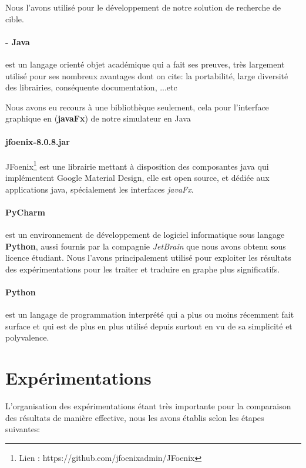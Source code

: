  Nous l'avons utilisé pour le développement de notre solution de recherche de cible.

\paragraph{- Java}  est un langage orienté objet académique qui a fait ses preuves, très largement utilisé pour ses nombreux avantages dont on cite: la portabilité,
large diversité des librairies, conséquente documentation, ...etc

Nous avons eu recours à une bibliothèque seulement, cela pour l'interface graphique en (\textbf{javaFx}) de notre simulateur en Java 
\paragraph{jfoenix-8.0.8.jar} JFoenix\footnote{Lien : https://github.com/jfoenixadmin/JFoenix} est une librairie mettant à disposition des composantes java qui implémentent Google Material Design, elle est open source, et dédiée aux applications java, spécialement les interfaces \textit{javaFx}. 


\paragraph{PyCharm}
est un environnement de développement de logiciel informatique sous langage \textbf{Python}, aussi fournis par la compagnie \textit{JetBrain} que nous avons obtenu sous licence étudiant.
Nous l'avons principalement utilisé pour exploiter les résultats des expérimentations pour les traiter et traduire en graphe plus significatifs.

\paragraph{Python} est un langage de programmation interprété qui a plus ou moins récemment fait surface et qui est de plus en plus utilisé depuis surtout en vu de sa simplicité et polyvalence.











\section{Expérimentations}
L'organisation des expérimentations étant très importante pour la comparaison des résultats de manière effective, nous les avons établis selon les étapes suivantes:

